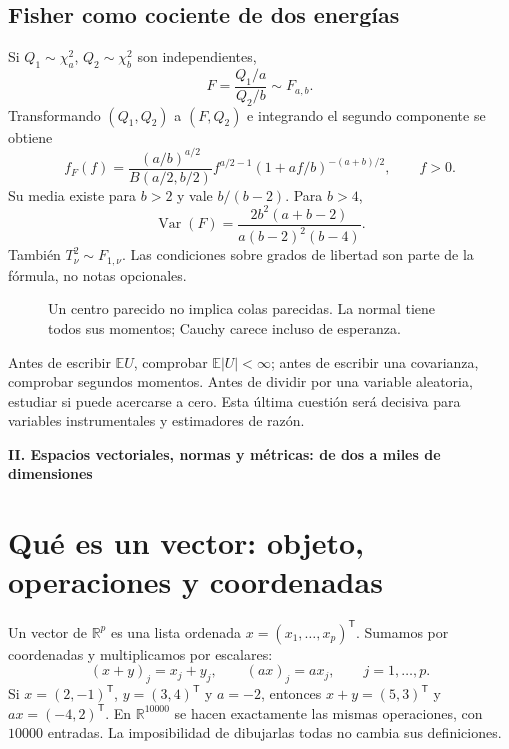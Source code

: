 \documentclass[11pt,a4paper]{article}
\newcommand{\R}{\mathbb R}
\newcommand{\E}{\mathbb E}
\newcommand{\T}{^{\mathsf T}}
\DeclareMathOperator{\Var}{Var}
\theoremstyle{definition}
\newcommand{\parte}[1]{\par\bigskip\Needspace{8\baselineskip}\begin{center}{\Large\bfseries\color{azul}#1}\end{center}}
\begin{document}
\subsection{Fisher como cociente de dos energías}
Si $Q_1\sim\chi^2_a$, $Q_2\sim\chi^2_b$ son independientes,
\[
F=\frac{Q_1/a}{Q_2/b}\sim F_{a,b}.
\]
Transformando $(Q_1,Q_2)$ a $(F,Q_2)$ e integrando el segundo componente se obtiene
\[
f_F(f)=\frac{(a/b)^{a/2}}{B(a/2,b/2)}
f^{a/2-1}(1+af/b)^{-(a+b)/2},\qquad f>0.
\]
Su media existe para $b>2$ y vale $b/(b-2)$. Para $b>4$,
\[
\Var(F)=\frac{2b^2(a+b-2)}{a(b-2)^2(b-4)}.
\]
También $T_\nu^2\sim F_{1,\nu}$. Las condiciones sobre grados de libertad son parte de la fórmula, no notas opcionales.
\begin{figure}[H]\centering
{}
\caption{Un centro parecido no implica colas parecidas. La normal tiene todos sus momentos; Cauchy carece incluso de esperanza.}
\end{figure}
\begin{idea}
Antes de escribir $\E U$, comprobar $\E|U|<\infty$; antes de escribir una covarianza, comprobar segundos momentos. Antes de dividir por una variable aleatoria, estudiar si puede acercarse a cero. Esta última cuestión será decisiva para variables instrumentales y estimadores de razón.
\end{idea}

\parte{II. Espacios vectoriales, normas y métricas: de dos a miles de dimensiones}
\section{Qué es un vector: objeto, operaciones y coordenadas}
Un vector de $\R^p$ es una lista ordenada $x=(x_1,\ldots,x_p)\T$. Sumamos por coordenadas y multiplicamos por escalares:
\[
(x+y)_j=x_j+y_j,\qquad (ax)_j=ax_j,\qquad j=1,\ldots,p.
\]
Si $x=(2,-1)\T$, $y=(3,4)\T$ y $a=-2$, entonces $x+y=(5,3)\T$ y $ax=(-4,2)\T$. En $\R^{10000}$ se hacen exactamente las mismas operaciones, con $10000$ entradas. La imposibilidad de dibujarlas todas no cambia sus definiciones.
\end{document}
